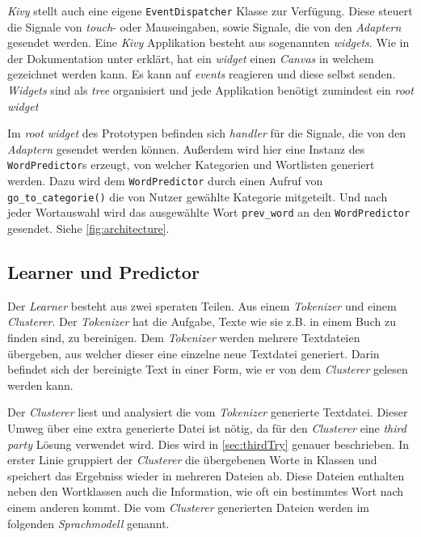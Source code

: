         \emph{Kivy} stellt auch eine eigene \texttt{EventDispatcher} Klasse zur Verfügung. Diese steuert die Signale von \emph{touch}- oder Mauseingaben, sowie Signale, die von den \emph{Adaptern} gesendet werden. Eine \emph{Kivy} Applikation besteht aus sogenannten \emph{widgets}. Wie in der Dokumentation unter \cite{kivy:widgets} erklärt, hat ein \emph{widget} einen \emph{Canvas} in welchem gezeichnet werden kann. Es kann auf \emph{events} reagieren und diese selbst senden. \emph{Widgets} sind als \emph{tree} organisiert und jede Applikation benötigt zumindest ein \emph{root widget}
        
        Im \emph{root widget} des Prototypen befinden sich \emph{handler} für die Signale, die von den \emph{Adaptern} gesendet werden können. Außerdem wird hier eine Instanz des \texttt{WordPredictor}s erzeugt, von welcher Kategorien und Wortlisten generiert werden. Dazu wird dem \texttt{WordPredictor} durch einen Aufruf von \texttt{go\_to\_categorie()} die von Nutzer gewählte Kategorie mitgeteilt. Und nach jeder Wortauswahl wird das ausgewählte Wort \texttt{prev\_word} an den \texttt{WordPredictor} gesendet. Siehe \autoref{fig:architecture}.
        
	\subsection{Learner und Predictor}
    \label{sec:design-learnerPredictor}
    
    	Der \emph{Learner} besteht aus zwei speraten Teilen. Aus einem \emph{Tokenizer} und einem \emph{Clusterer}. Der \emph{Tokenizer} hat die Aufgabe, Texte wie sie z.B. in einem Buch zu finden sind, zu bereinigen. Dem \emph{Tokenizer} werden mehrere Textdateien übergeben, aus welcher dieser eine einzelne neue Textdatei generiert. Darin befindet sich der bereinigte Text in einer Form, wie er von dem \emph{Clusterer} gelesen werden kann.

		Der \emph{Clusterer} liest und analysiert die vom \emph{Tokenizer} generierte Textdatei. Dieser Umweg über eine extra generierte Datei ist nötig, da für den \emph{Clusterer} eine \emph{third party} Lösung verwendet wird. Dies wird in \autoref{sec:thirdTry} genauer beschrieben. In erster Linie gruppiert der \emph{Clusterer} die übergebenen Worte in Klassen und speichert das Ergebniss wieder in mehreren Dateien ab. Diese Dateien enthalten neben den Wortklassen auch die Information, wie oft ein bestimmtes Wort nach einem anderen kommt. Die vom \emph{Clusterer} generierten Dateien werden im folgenden \emph{Sprachmodell} genannt.

